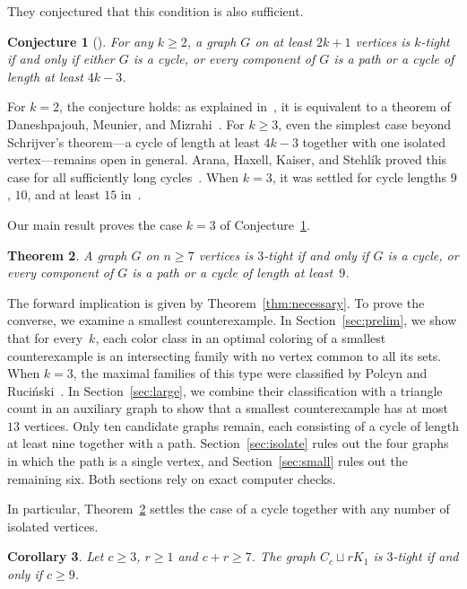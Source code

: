\documentclass[11pt]{amsart}
\newtheorem{theorem}{Theorem}[section]
\newtheorem{corollary}[theorem]{Corollary}
\newtheorem{conjecture}[theorem]{Conjecture}
\theoremstyle{definition}
\theoremstyle{remark}
\numberwithin{equation}{section}
\begin{document}
They conjectured that this condition is also sufficient.

\begin{conjecture}[{\cite[Conjecture~1.3]{AHKS}}]\label{conj:AHKS}
For any $k\ge2$, a graph $G$ on at least $2k+1$ vertices is $k$-tight if and
only if either $G$ is a cycle, or every component of $G$ is a path or a cycle
of length at least $4k-3$.
\end{conjecture}

For $k=2$, the conjecture holds: as explained in~\cite[Theorem~1.1]{AHKS}, it
is equivalent to a theorem of Daneshpajouh, Meunier, and Mizrahi~\cite{DMM}.
For $k\ge3$, even the simplest case beyond Schrijver's theorem---a cycle of
length at least $4k-3$ together with one isolated vertex---remains open in
general. Arana, Haxell, Kaiser, and Stehl\'ik proved this case for all
sufficiently long cycles~\cite[Theorem~1.4]{AHKS}. When $k=3$, it was settled
for cycle lengths $9$, $10$, and at least $15$ in~\cite{AFTD}.

Our main result proves the case $k=3$ of Conjecture~\ref{conj:AHKS}.

\begin{theorem}\label{thm:main}
A graph $G$ on $n\ge7$ vertices is $3$-tight if and only if $G$ is a cycle, or
every component of $G$ is a path or a cycle of length at least~$9$.
\end{theorem}

The forward implication is given by Theorem~\ref{thm:necessary}. To prove the
converse, we examine a smallest counterexample. In Section~\ref{sec:prelim}, we
show that for every~$k$, each color class in an optimal coloring of a smallest
counterexample is an intersecting family with no vertex common to all its sets.
When $k=3$, the maximal families of this type were classified by Polcyn and
Ruci\'nski~\cite{PR}. In Section~\ref{sec:large}, we combine their
classification with a triangle count in an auxiliary graph to show that a
smallest counterexample has at most $13$ vertices. Only ten candidate graphs
remain, each consisting of a cycle of length at least nine together with a
path. Section~\ref{sec:isolate} rules out the four graphs in which the path is
a single vertex, and Section~\ref{sec:small} rules out the remaining six. Both
sections rely on exact computer checks.

In particular, Theorem~\ref{thm:main} settles the case of a cycle together with
any number of isolated vertices.

\begin{corollary}\label{cor:isolates}
Let $c\ge3$, $r\ge1$ and $c+r\ge7$. The graph $C_c\sqcup rK_1$ is $3$-tight if
and only if $c\ge9$.
\end{corollary}
\end{document}

